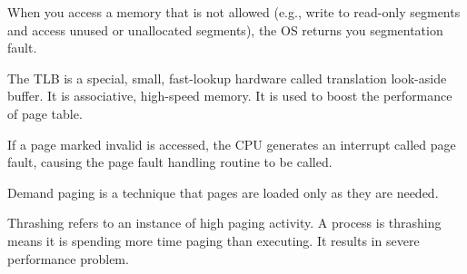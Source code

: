 \documentclass[11pt]{homework}
\begin{document}
\setlength{\intextsep}{0em}
\setlength{\belowdisplayskip}{.25em} \setlength{\belowdisplayshortskip}{.25em}
\setlength{\abovedisplayskip}{.25em} \setlength{\abovedisplayshortskip}{.25em}
\maketitle
\question
\begin{description}[leftmargin = !, labelwidth = \widthof{\bfseries Segmentation Fault}]
    \item[Segmentation Fault] When you access a memory that is not allowed (e.g., write to read-only
        segments and access unused or unallocated segments), the OS returns you segmentation fault.
    \item[TLB] The TLB is a special, small, fast-lookup hardware called translation look-aside buffer.
        It is associative, high-speed memory. It is used to boost the performance of page table.
    \item[Page Fault] If a page marked invalid is accessed, the CPU generates an interrupt called
        page fault, causing the page fault handling routine to be called.
    \item[Demand Paging] Demand paging is a technique that pages are loaded only as they are needed.
\end{description}
\question
Thrashing refers to an instance of high paging activity. A process is thrashing means it is spending
more time paging than executing. It results in severe performance problem.
\end{document}
